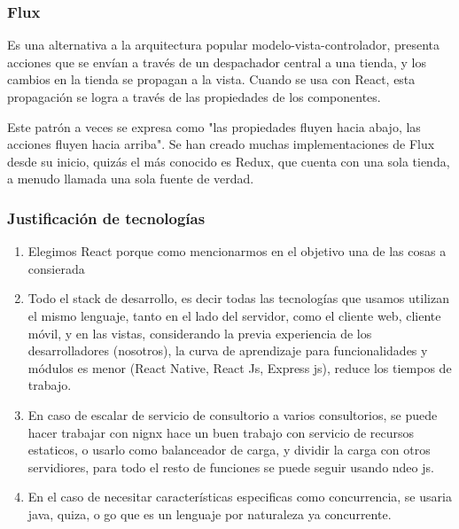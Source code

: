\subsubsection{Flux}

Es una alternativa a la arquitectura popular modelo-vista-controlador, presenta acciones que se envían a través de un despachador central a una tienda, y los cambios en la tienda se propagan a la vista.  Cuando se usa con React, esta propagación se logra a través de las propiedades de los componentes.

Este patrón a veces se expresa como "las propiedades fluyen hacia abajo, las acciones fluyen hacia arriba". Se han creado muchas implementaciones de Flux desde su inicio, quizás el más conocido es Redux, que cuenta con una sola tienda, a menudo llamada una sola fuente de verdad.

\subsubsection{Justificación de tecnologías}

\begin{enumerate}
     \item Elegimos React porque como mencionarmos en el objetivo una de las cosas a consierada 
     \item Todo el stack de desarrollo, es decir todas las tecnologías que usamos utilizan el mismo lenguaje, tanto en el lado del servidor, como el cliente web, cliente móvil, y en las vistas, considerando la previa experiencia de los desarrolladores (nosotros), la curva de aprendizaje para funcionalidades y módulos es menor (React Native, React Js, Express js), reduce los tiempos de trabajo.
     \item En caso de escalar de servicio de consultorio a varios consultorios, se puede hacer trabajar con nignx hace un buen trabajo con servicio de recursos estaticos, o usarlo como balanceador de carga, y dividir la carga con otros servidiores, para todo el resto de funciones se puede seguir usando ndeo js.
     \item En el caso de necesitar características especificas como concurrencia, se usaria java, quiza, o go que es un lenguaje por naturaleza ya concurrente.
\end{enumerate}

